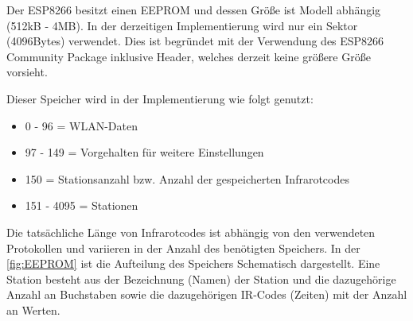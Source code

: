 Der ESP8266 besitzt einen \acs{EEPROM} und dessen Größe ist Modell abhängig (512kB - 4MB).
In der derzeitigen Implementierung wird nur ein Sektor (4096Bytes) verwendet.
Dies ist begründet mit der Verwendung des ESP8266 Community Package inklusive Header, welches derzeit keine größere Größe vorsieht.

Dieser Speicher wird in der Implementierung wie folgt genutzt: 
\begin{itemize}
	\item 0 - 96 = WLAN-Daten
	\item 97 - 149 = Vorgehalten für weitere Einstellungen
	\item 150 = Stationsanzahl bzw. Anzahl der gespeicherten Infrarotcodes
	\item 151 - 4095 = Stationen
\end{itemize}
Die tatsächliche Länge von Infrarotcodes ist abhängig von den verwendeten Protokollen und variieren in der Anzahl des benötigten Speichers.
In der \autoref{fig:EEPROM} ist die Aufteilung des Speichers Schematisch dargestellt.
Eine Station besteht aus der Bezeichnung (Namen) der Station und die dazugehörige Anzahl an Buchstaben sowie die dazugehörigen IR-Codes (Zeiten) mit der Anzahl an Werten.
